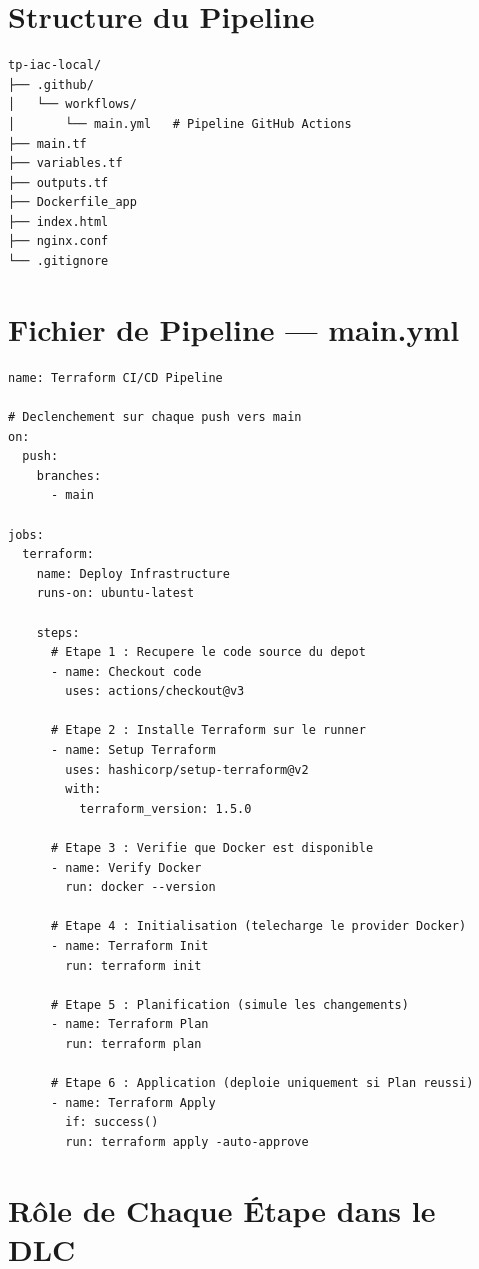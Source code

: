 \documentclass[12pt,a4paper]{article}
\begin{document}
\section{\textcolor{cicdGreen}{Structure du Pipeline}}

\begin{lstlisting}[style=termStyle, caption=Structure du dépôt avec CI/CD]
tp-iac-local/
├── .github/
│   └── workflows/
│       └── main.yml   # Pipeline GitHub Actions
├── main.tf
├── variables.tf
├── outputs.tf
├── Dockerfile_app
├── index.html
├── nginx.conf
└── .gitignore
\end{lstlisting}

\section{\textcolor{cicdGreen}{Fichier de Pipeline --- main.yml}}

\begin{lstlisting}[style=yamlStyle, caption=.github/workflows/main.yml]
name: Terraform CI/CD Pipeline

# Declenchement sur chaque push vers main
on:
  push:
    branches:
      - main

jobs:
  terraform:
    name: Deploy Infrastructure
    runs-on: ubuntu-latest

    steps:
      # Etape 1 : Recupere le code source du depot
      - name: Checkout code
        uses: actions/checkout@v3

      # Etape 2 : Installe Terraform sur le runner
      - name: Setup Terraform
        uses: hashicorp/setup-terraform@v2
        with:
          terraform_version: 1.5.0

      # Etape 3 : Verifie que Docker est disponible
      - name: Verify Docker
        run: docker --version

      # Etape 4 : Initialisation (telecharge le provider Docker)
      - name: Terraform Init
        run: terraform init

      # Etape 5 : Planification (simule les changements)
      - name: Terraform Plan
        run: terraform plan

      # Etape 6 : Application (deploie uniquement si Plan reussi)
      - name: Terraform Apply
        if: success()
        run: terraform apply -auto-approve
\end{lstlisting}

\section{\textcolor{cicdGreen}{Rôle de Chaque Étape dans le DLC}}
\end{document}
